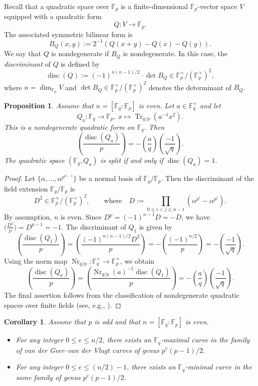 \documentclass[12pt,a4paper]{amsart}
\newtheorem{corollary}[theorem]{Corollary}
\newtheorem{proposition}[theorem]{Proposition}
\theoremstyle{definition}
\def\F{{\mathbb F}}
\theoremstyle{remark}
\DeclareMathOperator{\disc}{disc}
\DeclareMathOperator{\Tr}{Tr}
\DeclareMathOperator{\Nr}{Nr}
\begin{document}
Recall that a quadratic space over $\F_p$ is a finite-dimensional
$\F_p$-vector space $V$ equipped with a quadratic form
\[
Q:V\to\F_p.
\]
The associated symmetric bilinear form is 
\[B_Q(x,y):=2^{-1}(Q(x+y)-Q(x)-Q(y)). \]
We say that $Q$ is nondegenerate if 
 $B_Q$ is nondegenerate. 
In this case, 
the \emph{discriminant} of $Q$ is defined by 
\[
\disc(Q):=(-1)^{n(n-1)/2} \cdot \det B_Q \in \F_p^{\times}/(\F_p^{\times})^2,  
\]
where $n=\dim_{\F_p}V$ and $\det B_Q \in \F_p^{\times}/(\F_p^{\times})^2$ denotes the determinant of $B_Q$.
\begin{proposition}\label{split}
Assume that $n=[\F_q:\F_p]$ is even. 
Let $a \in \F_q^{\times}$ and let 
\[Q_a \colon \F_q \to \F_p,\ x \mapsto \Tr_{q/p}(a^{-1}x^2).\]
This is a nondegenerate quadratic form on $\F_q$. 
Then 
\[
\left(\frac{\disc(Q_a)}{p}\right)=-\left(\frac{a}{q}\right)\left(\frac{-1}{\sqrt{q}}\right). 
\]
The quadratic space $(\F_q,Q_a)$ is split if and only if 
$\disc(Q_a)=1$. 
\end{proposition}
\begin{proof}
Let $\{\alpha,\ldots,\alpha^{p^{n-1}}\}$
be a normal basis of $\F_q/\F_p$. 
Then the discriminant of the field extension $\F_q/\F_p$ is 
\[
D^2\in \F_p^{\times}/(\F_p^{\times})^2, \qquad 
\textrm{where} \quad D:=\prod_{0 \le i<j \le n-1} 
(\alpha^{p^i}-\alpha^{p^j}). 
\]
By assumption, $n$ is even. 
Since $D^p=(-1)^{n-1}D=-D$, 
we have $\bigl(\frac{D^2}{p}\bigr)
=D^{p-1}=-1$. 
The discriminant of $Q_1$ is given by 
\[
\left(\frac{\disc(Q_1)}{p}\right)=\left(\frac{(-1)^{n(n-1)/2} D^2}{p}\right)=-\left(\frac{(-1)^{n/2}}{p}\right)=-\left(\frac{-1}{\sqrt{q}}\right). 
\]
Using the norm map $\Nr_{q/p} \colon \F_q^{\times} \to \F_p^{\times}$, we obtain
\[
\left(\frac{\disc(Q_a)}{p}\right)=
\left(\frac{\Nr_{q/p}(a)^{-1}\disc(Q_1)}{p}\right)
=-\left(\frac{a}{q}\right)\left(\frac{-1}{\sqrt{q}}\right). 
\]
The final assertion follows from the classification of
nondegenerate quadratic spaces over finite fields (see, e.g., \cite[Chapter~II, \S3, p.~30 and p.~36]{Lam}). 
\end{proof}
\begin{corollary}\label{exist}
Assume that $p$ is odd and that $n=[\F_q:\F_p]$ is even. 
\begin{itemize}
\item[{\rm (i)}] For any integer $0 \le e \le n/2$, 
there exists an $\F_q$-maximal curve in the family of van der Geer--van der Vlugt curves 
of genus $p^e(p-1)/2$.
\item[{\rm (ii)}] For any integer $0 \le e \le (n/2)-1$, 
there exists an $\F_q$-minimal curve in the same 
family 
of genus $p^e(p-1)/2$.
\end{itemize}
\end{corollary}
\end{document}
